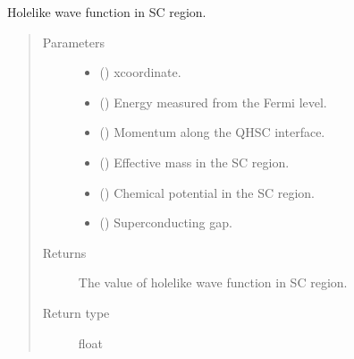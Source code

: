 \documentclass[letterpaper,10pt,english]{sphinxmanual}
\begin{document}
\begin{fulllineitems}
\label{\detokenize{modules:modules.functions.phi_m}}
\pysigstartsignatures
{}
\pysigstopsignatures
\sphinxAtStartPar
Hole\sphinxhyphen{}like wave function in SC region.
\begin{quote}\begin{description}
\item[{Parameters}] \leavevmode\begin{itemize}
\item {} 
\sphinxAtStartPar
{} () \textendash{} x\sphinxhyphen{}coordinate.

\item {} 
\sphinxAtStartPar
{} () \textendash{} Energy measured from the Fermi level.

\item {} 
\sphinxAtStartPar
{} () \textendash{} Momentum along the QH\sphinxhyphen{}SC interface.

\item {} 
\sphinxAtStartPar
{} () \textendash{} Effective mass in the SC region.

\item {} 
\sphinxAtStartPar
{} () \textendash{} Chemical potential in the SC region.

\item {} 
\sphinxAtStartPar
{} () \textendash{} Superconducting gap.

\end{itemize}

\item[{Returns}] \leavevmode
\sphinxAtStartPar
The value of hole\sphinxhyphen{}like wave function in SC region.

\item[{Return type}] \leavevmode
\sphinxAtStartPar
float

\end{description}\end{quote}

\end{fulllineitems}
\end{document}
